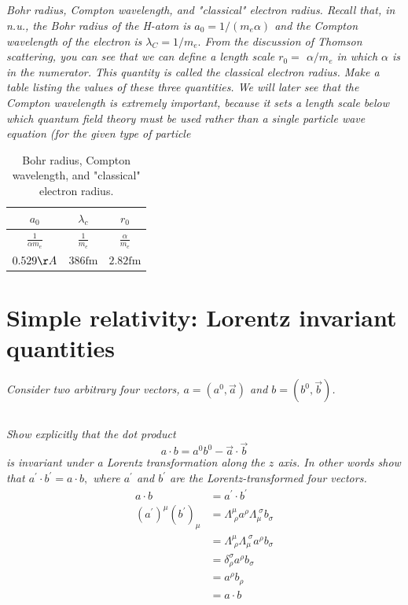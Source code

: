 \documentclass{article}
\begin{document}
\subsection{}
\textit{Bohr radius, Compton wavelength, and "classical" electron radius. Recall that, in n.u., the Bohr radius of the H-atom is $a_{0}=1 /\left(m_{e} \alpha\right)$ and the Compton wavelength of the electron is $\lambda_{C}=1 / m_{e} .$ From the discussion of Thomson scattering, you can see that we can define a length scale $r_{0}=$ $\alpha / m_{e}$ in which $\alpha$ is in the numerator. This quantity is called the classical electron radius. Make a table listing the values of these three quantities. We will later see that the Compton wavelength is extremely important, because it sets a length scale below which quantum field theory must be used rather than a single particle wave equation (for the given type of particle}

\begin{table}[]
    \centering
    \begin{tabular}{||c|c|c||}
        \hline\hline$a_{0}$ & $\lambda_{c}$ & $r_{0}$ \\
        \hline$\frac{1}{\alpha m_{e}}$ & $\frac{1}{m_{e}}$ & $\frac{\alpha}{m_{e}}$ \\
        \hline $0.529 \AA$ & $386 \mathrm{fm}$ & $2.82 \mathrm{fm}$ \\
        \hline\hline
    \end{tabular}
    \caption{Bohr radius, Compton wavelength, and "classical" electron radius.}
    \label{tab:my_label}
\end{table}




\newpage


\section{Simple relativity: Lorentz invariant quantities}
\textit{Consider two arbitrary four vectors, $a=\left(a^{0}, \vec{a}\right)$ and $b=\left(b^{0}, \vec{b}\right)$.}

\subsection{}
\textit{Show explicitly that the dot product
$$
a \cdot b=a^{0} b^{0}-\vec{a} \cdot \vec{b}
$$
is invariant under a Lorentz transformation along the $z$ axis. In other words show that $a^{\prime} \cdot b^{\prime}=a \cdot b,$ where $a^{\prime}$ and $b^{\prime}$ are the Lorentz-transformed four vectors.}
\begin{align*}
    a \cdot b&=a^{\prime} \cdot b^{\prime}\\
    (a^\prime)^{\mu} (b^\prime)_{\mu}&=\Lambda_{\;\rho}^{\mu} a^{\rho} \Lambda_{\mu}^{\;\sigma} b_{\sigma}\\
    &=\Lambda^{\mu} _{\;\rho} \Lambda_{\mu}^{\;\sigma} a^{\rho} b_{\sigma}\\
    &=\delta_{\rho}^{\sigma} a^{\rho} b_{\sigma} \\
    &= a^{\rho} b_{\rho} \\
    &= a \cdot b
\end{align*}
\end{document}
